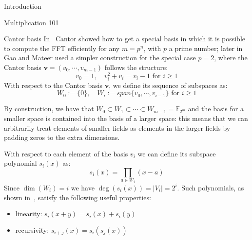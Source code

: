 \documentclass[a4paper,10pt]{article}
\begin{document}
\begin{section}{Introduction}
\begin{subsection}{Multiplication 101}
\end{subsection}


\begin{subsection}{Cantor basis}
    In~\cite{cantor1989arithmetical} Cantor showed how to get a special basis in which it is possible to compute the FFT efficiently
    for any $m = p^n$, with $p$ a prime number; later in~\cite{gao2010additive} Gao and Mateer used a simpler construction for the special case
    $p=2$, where the Cantor basis $\mathbf{v} = (v_0, \cdots, v_{m-1})$ follows the structure:
    \begin{equation}
        v_0 = 1, \quad v_i^2+v_i = v_i-1 \text{ for } i \geq 1
    \end{equation}
    With respect to the Cantor basis $\mathbf{v}$, we define its sequence of subspaces as:
    \begin{equation}
        W_0 := \{0\}, \quad W_i := span\{v_0, \cdots, v_{i-1}\} \text{ for } i \geq 1
    \end{equation}

    By construction, we have that $W_0 \subset W_1 \subset \cdots \subset W_{m-1} = \mathds{F}_{2^m}$ and the basis for a smaller space is contained into the basis of a larger space: this means that 
    we can arbitrarily treat elements of smaller fields as elements in the larger fields by padding zeros to the extra dimensions.

    With respect to each element of the basis $v_i$ we can define its subspace polynomial $s_i(x)$ as:
    \begin{equation}
        s_i(x) = \prod_{a \in W_i} (x - a)
    \end{equation}
    Since $\dim(W_i) = i$ we have $\deg(s_i(x)) = |V_i| = 2^i$.
    Such polynomials, as shown in~\cite{cantor1989arithmetical, gao2010additive}, satisfy the following useful properties:
    \begin{itemize}
        \item linearity: $s_i(x+y) = s_i(x) + s_i(y)$
        \item recursivity: $s_{i+j}(x) = s_i(s_j(x))$
    \end{itemize}

\end{subsection}



\end{section}
\end{document}
